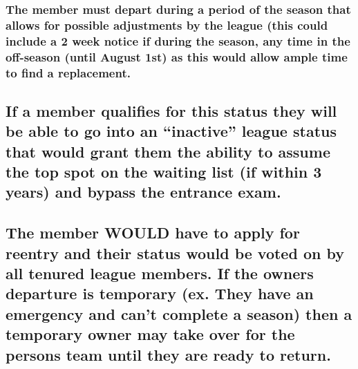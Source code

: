 \documentclass[
]{book}
\begin{document}
\hypertarget{the-member-must-depart-during-a-period-of-the-season-that-allows-for-possible-adjustments-by-the-league-this-could-include-a-2-week-notice-if-during-the-season-any-time-in-the-off-season-until-august-1st-as-this-would-allow-ample-time-to-find-a-replacement.}{%
\subsubsection{The member must depart during a period of the season that allows for possible adjustments by the league (this could include a 2 week notice if during the season, any time in the off-season (until August 1st) as this would allow ample time to find a replacement.}\label{the-member-must-depart-during-a-period-of-the-season-that-allows-for-possible-adjustments-by-the-league-this-could-include-a-2-week-notice-if-during-the-season-any-time-in-the-off-season-until-august-1st-as-this-would-allow-ample-time-to-find-a-replacement.}}

\hypertarget{if-a-member-qualifies-for-this-status-they-will-be-able-to-go-into-an-inactive-league-status-that-would-grant-them-the-ability-to-assume-the-top-spot-on-the-waiting-list-if-within-3-years-and-bypass-the-entrance-exam.}{%
\subsection{If a member qualifies for this status they will be able to go into an ``inactive'' league status that would grant them the ability to assume the top spot on the waiting list (if within 3 years) and bypass the entrance exam.}\label{if-a-member-qualifies-for-this-status-they-will-be-able-to-go-into-an-inactive-league-status-that-would-grant-them-the-ability-to-assume-the-top-spot-on-the-waiting-list-if-within-3-years-and-bypass-the-entrance-exam.}}

\hypertarget{the-member-would-have-to-apply-for-reentry-and-their-status-would-be-voted-on-by-all-tenured-league-members.-if-the-owners-departure-is-temporary-ex.-they-have-an-emergency-and-cant-complete-a-season-then-a-temporary-owner-may-take-over-for-the-persons-team-until-they-are-ready-to-return.}{%
\subsection{The member WOULD have to apply for reentry and their status would be voted on by all tenured league members. If the owners departure is temporary (ex. They have an emergency and can't complete a season) then a temporary owner may take over for the persons team until they are ready to return.}\label{the-member-would-have-to-apply-for-reentry-and-their-status-would-be-voted-on-by-all-tenured-league-members.-if-the-owners-departure-is-temporary-ex.-they-have-an-emergency-and-cant-complete-a-season-then-a-temporary-owner-may-take-over-for-the-persons-team-until-they-are-ready-to-return.}}
\end{document}
